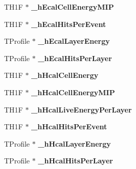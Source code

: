 \begin{DoxyCompactItemize}
\item 
T\-H1\-F $\ast$ {\bfseries \-\_\-h\-Ecal\-Cell\-Energy\-M\-I\-P}\label{classdigisim_1_1Analysis_abd50a9947512532269f9dd197bb5b6df}

\item 
T\-H1\-F $\ast$ {\bfseries \-\_\-h\-Ecal\-Hits\-Per\-Event}\label{classdigisim_1_1Analysis_a3ef8ff0015e1f346a7118d7e6db85e3a}

\item 
T\-Profile $\ast$ {\bfseries \-\_\-h\-Ecal\-Layer\-Energy}\label{classdigisim_1_1Analysis_aab2aadd135e334396b43d53e18ad5a9f}

\item 
T\-Profile $\ast$ {\bfseries \-\_\-h\-Ecal\-Hits\-Per\-Layer}\label{classdigisim_1_1Analysis_a6d441cf365fd2d8e920a69673b9e398c}

\item 
T\-H1\-F $\ast$ {\bfseries \-\_\-h\-Hcal\-Cell\-Energy}\label{classdigisim_1_1Analysis_a2cad795e5aaa76f30cf8b8b0633faec3}

\item 
T\-H1\-F $\ast$ {\bfseries \-\_\-h\-Hcal\-Cell\-Energy\-M\-I\-P}\label{classdigisim_1_1Analysis_a83c17757df81607d0d9d6db4932d3cf2}

\item 
T\-H1\-F $\ast$ {\bfseries \-\_\-h\-Hcal\-Live\-Energy\-Per\-Layer}\label{classdigisim_1_1Analysis_a9368b4c0d2acabcbd5d84f0276491c33}

\item 
T\-H1\-F $\ast$ {\bfseries \-\_\-h\-Hcal\-Hits\-Per\-Event}\label{classdigisim_1_1Analysis_ac1c375d006159732565f7af0db77c406}

\item 
T\-Profile $\ast$ {\bfseries \-\_\-h\-Hcal\-Layer\-Energy}\label{classdigisim_1_1Analysis_a43deac993af029b83ab38b651c03566e}

\item 
T\-Profile $\ast$ {\bfseries \-\_\-h\-Hcal\-Hits\-Per\-Layer}\label{classdigisim_1_1Analysis_ac5c905987df1a92f991e0f48c66a12ca}

\end{DoxyCompactItemize}
